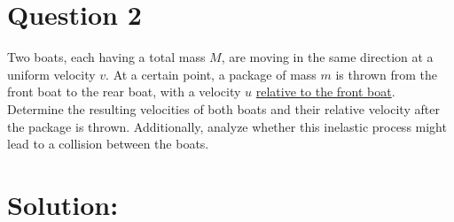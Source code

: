 \section*{Question 2}
Two boats, each having a total mass $M$, are moving in the same direction at a uniform velocity $v$. At a certain point, a package of mass $m$ is thrown from the front boat to the rear boat, with a velocity $u$ \underline{relative to the front boat}. Determine the resulting velocities of both boats and their relative velocity after the package is thrown. Additionally, analyze whether this inelastic process might lead to a collision between the boats.

\section*{Solution:}